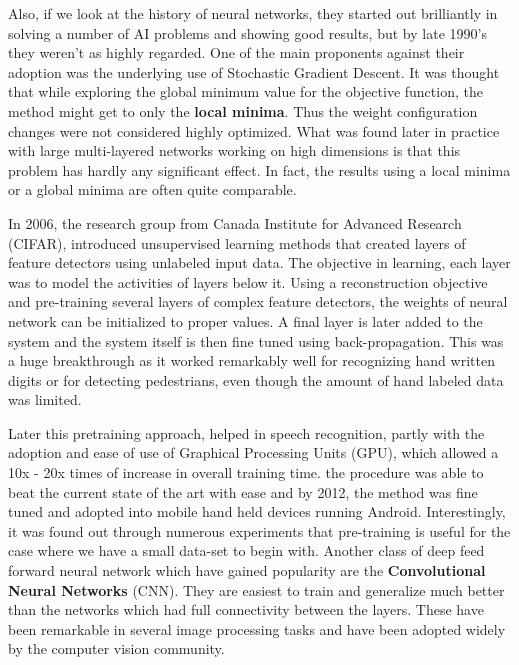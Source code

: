 Also, if we look at the history of neural networks, they started out brilliantly in solving a number of AI problems and showing good results, but by late 1990's they weren't as highly regarded. One of the main proponents against their adoption was the underlying use of Stochastic Gradient Descent. It was thought that while exploring the global minimum value for the objective function, the method might get to only the \textbf{local minima}. Thus the weight configuration changes were not considered  highly optimized. What was found later in practice with large multi-layered networks working on high dimensions is that this problem has hardly any significant effect. In fact, the results using a local minima or a global minima are often quite comparable.
\newline 

In 2006, the research group from Canada Institute for Advanced Research (CIFAR),   introduced unsupervised learning methods that created layers of feature detectors using unlabeled input data. The objective in learning, each layer was to model the activities of layers below it. Using a reconstruction objective and pre-training several layers of  complex feature detectors, the weights of neural network can be initialized to proper values.  A final layer is later added to the system and the system itself is then fine tuned using back-propagation. This was a huge breakthrough as it worked remarkably well for recognizing hand written digits or for detecting pedestrians, even though the amount of hand labeled data was limited.
\newline

Later this pretraining approach, helped in speech recognition, partly with the adoption and ease of use of Graphical Processing Units (GPU), which allowed a 10x - 20x times of increase in overall training time. the procedure was able to beat the current state of the art with ease and by 2012, the method was fine tuned and adopted into mobile hand held devices running Android\footnotemark. 
Interestingly, it was found out through numerous experiments that pre-training is useful for the case where we have a small data-set to begin with. Another class of deep feed forward neural network which have gained popularity are the \textbf{Convolutional Neural Networks} (CNN). They are easiest to train and generalize much better than the networks which had full connectivity between the layers. These have been remarkable in several image processing tasks and have been adopted widely by the computer vision community. 